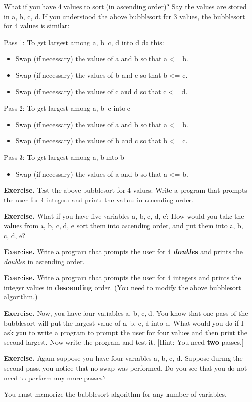\documentclass[
]{article}
\providecommand{\tightlist}{%
  \setlength{\itemsep}{0pt}\setlength{\parskip}{0pt}}
\begin{document}
What if you have 4 values to sort (in ascending order)? Say the values
are stored in a, b, c, d. If you understood the above bubblesort for 3
values, the bubblesort for 4 values is similar:

Pass 1: To get largest among a, b, c, d into d do this:

\begin{itemize}
\tightlist
\item
  Swap (if necessary) the values of a and b so that a \textless= b.
\item
  Swap (if necessary) the values of b and c so that b \textless= c.
\item
  Swap (if necessary) the values of c and d so that c \textless= d.
\end{itemize}

Pass 2: To get largest among a, b, c into c

\begin{itemize}
\tightlist
\item
  Swap (if necessary) the values of a and b so that a \textless= b.
\item
  Swap (if necessary) the values of b and c so that b \textless= c.
\end{itemize}

Pass 3: To get largest among a, b into b

\begin{itemize}
\tightlist
\item
  Swap (if necessary) the values of a and b so that a \textless= b.
\end{itemize}

\textbf{Exercise. }Test the above bubblesort for 4 values: Write a
program that prompts the user for 4 integers and prints the values in
ascending order.

\textbf{Exercise. }What if you have five variables a, b, c, d, e? How
would you take the values from a, b, c, d, e sort them into ascending
order, and put them into a, b, c, d, e?

\textbf{Exercise.} Write a program that prompts the user for 4
\emph{\textbf{double}}\textbf{s} and prints the \emph{double}s in
ascending order.

\textbf{Exercise. }Write a program that prompts the user for 4 integers
and prints the integer values in \textbf{descending} order. (You need to
modify the above bubblesort algorithm.)

\textbf{Exercise.} Now, you have four variables a, b, c, d. You know
that one pass of the bubblesort will put the largest value of a, b, c, d
into d. What would you do if I ask you to write a program to prompt the
user for four values and then print the second largest. Now write the
program and test it. {[}Hint: You need \textbf{two} passes.{]}

\textbf{Exercise.} Again suppose you have four variables a, b, c, d.
Suppose during the second pass, you notice that no swap was performed.
Do you see that you do not need to perform any more passes?

You must memorize the bubblesort algorithm for any number of variables.
\end{document}
